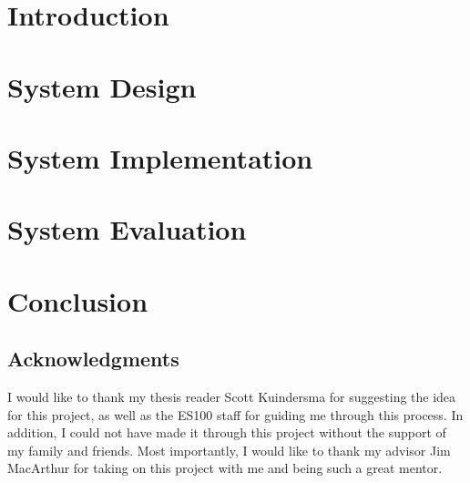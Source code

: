 \documentclass[11pt]{report}
\begin{document}
	\pagestyle{plain}
	

	

	\tableofcontents

	\listoffigures

	\listoftables

	\pagestyle{fancy}

	\chapter{Introduction}	%
	
	

	\chapter{System Design}
	

	\chapter{System Implementation}
	

	\chapter{System Evaluation}
	

	\chapter{Conclusion}
	

	\newpage

	\begin{center}
	\chapter*{Acknowledgments}

	I would like to thank my thesis reader Scott Kuindersma for suggesting the idea for this project, as well as the ES100 staff for guiding me through this process.  In addition, I could not have made it through this project without the support of my family and friends.  Most importantly, I would like to thank my advisor Jim MacArthur for taking on this project with me and being such a great mentor.  
	\end{center}
\end{document}
